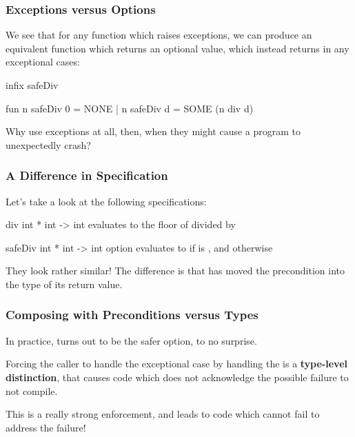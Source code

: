 \documentclass[aspectratio=169]{beamer}
\begin{document}
\begin{frame}[fragile]
  \frametitle{Exceptions versus Options}

  We see that for any function which raises exceptions, we can produce
  an equivalent function which returns an optional value, which instead
  returns  in any exceptional cases:

  \pause
  \begin{codeblock}
    infix safeDiv

    fun n safeDiv 0 = NONE 
      | n safeDiv d = SOME (n div d)
  \end{codeblock}

  \pause
  \vspace{\fill}

  Why use exceptions at all, then, when they might cause a program to
  unexpectedly crash?
\end{frame}

\begin{frame}[fragile]
  \frametitle{A Difference in Specification}

  Let's take a look at the following specifications:

  \pause
  \spec
    {div}
    {int * int -> int}
    {}
    { evaluates to the
    floor of  divided by }

  \pause
  \spec
    {safeDiv}
    {int * int -> int option}
    {}
    { evaluates to  if  is , 
    and  otherwise}

  \pause
  They look rather similar! The difference is that  has 
  moved the precondition into the type of its return value.
\end{frame}

\begin{frame}[fragile]
  \frametitle{Composing with Preconditions versus Types}

  \tgs

  In practice,  turns out to be the safer option,
  to no surprise.

  \pause
  \vspace{\fill}

  Forcing the caller to handle the exceptional case by handling the
   is a \textbf{type-level distinction}, that causes code which
  does not acknowledge the possible failure to not compile.

  \pause
  \vspace{\fill}

  This is a really strong enforcement, and leads to code which cannot
  fail to address the failure!
\end{frame}
\end{document}
